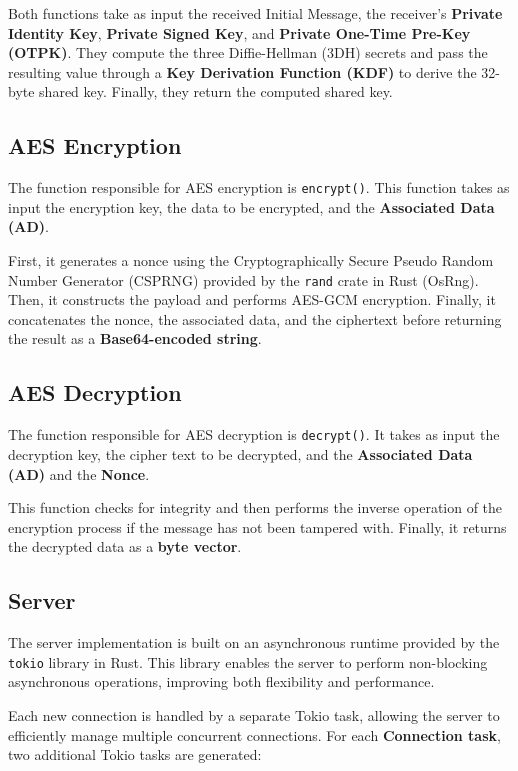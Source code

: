 Both functions take as input the received Initial Message, the receiver's \textbf{Private Identity Key}, \textbf{Private Signed Key}, and \textbf{Private One-Time Pre-Key (OTPK)}. They compute the three Diffie-Hellman (3DH) secrets and pass the resulting value through a \textbf{Key Derivation Function (KDF)} to derive the 32-byte shared key. Finally, they return the computed shared key.  

\subsection{AES Encryption}
\label{subsec:AESEncryption}

The function responsible for AES encryption is \texttt{encrypt()}. This function takes as input the encryption key, the data to be encrypted, and the \textbf{Associated Data (AD)}.

First, it generates a nonce using the Cryptographically Secure Pseudo Random Number Generator (CSPRNG) provided by the \texttt{rand} crate in Rust (OsRng). Then, it constructs the payload and performs AES-GCM encryption. Finally, it concatenates the nonce, the associated data, and the ciphertext before returning the result as a \textbf{Base64-encoded string}.

\subsection{AES Decryption}
\label{subsec:AESDecryption}

The function responsible for AES decryption is \texttt{decrypt()}. It takes as input the decryption key, the cipher text to be decrypted, and the \textbf{Associated Data (AD)} and the \textbf{Nonce}.

This function checks for integrity and then performs the inverse operation of the encryption process if the message has not been tampered with. Finally, it returns the decrypted data as a \textbf{byte vector}.


\subsection{Server}
\label{subsec:Server}
The server implementation is built on an asynchronous runtime provided by the \texttt{tokio} library in Rust. This library enables the server to perform non-blocking asynchronous operations, improving both flexibility and performance.  

Each new connection is handled by a separate Tokio task, allowing the server to efficiently manage multiple concurrent connections. For each \textbf{Connection task}, two additional Tokio tasks are generated:

